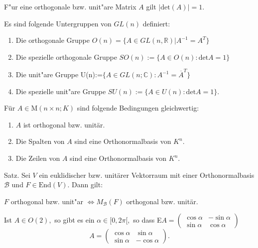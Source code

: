 \documentclass[8pt, a4paper, twocolumn, landscape]{article}
\begin{document}
\begin{remark}
F"ur eine orthogonale bzw. unit"are Matrix $A$ gilt $|\mathrm{det}(A)| = 1$.
\end{remark}

\begin{definition}
Es sind folgende Untergruppen von $GL(n)$ definiert:
\begin{enumerate}
\item Die orthogonale Gruppe $O(n) = \{ A \in GL(n, \mathbb{R}) | A^{-1} = A^T \}$
\item Die spezielle orthogonale Gruppe $SO(n):=\{A \in O(n): \mathrm{det} A=1\}$
\item Die unit"are Gruppe U(n):=$\{A \in GL(n ; \mathbb{C}): A^{-1}= \overline{A}^T\}$
\item Die spezielle unit"are Gruppe $SU(n):=\{A \in U(n): \mathrm{det} A=1\}$.
\end{enumerate}

\end{definition}

\begin{remark}
Für \(A \in \mathrm{M}(n \times n ; K)\) sind folgende Bedingungen gleichwertig:
\begin{enumerate}
\item \(A\) ist orthogonal bzw. unitär.
\item Die Spalten von \(A\) sind eine Orthonormalbasis von \(K^{n}\).
\item Die Zeilen von \(A\) sind eine Orthonormalbasis von \(K^{n}\).
\end{enumerate}
\end{remark}


\begin{theorem}
Satz. Sei \(V\) ein euklidischer bzw. unitärer Vektorraum mit einer Orthonormalbasis \(\mathcal{B}\) und \(F \in \mathrm{End}(V)\). Dann gilt:

$F$ orthogonal bzw. unit"ar $\Leftrightarrow M_{\mathcal{B}}(F)$ orthogonal bzw. unitär.
\end{theorem}

\begin{lemma}
Ist \(A \in O(2),\) so gibt es ein \(\alpha \in[0,2 \pi[,\) so dass
E$A=\left(\begin{array}{cc}\cos \alpha  & -\sin \alpha 
\\ \sin \alpha & \cos \alpha\end{array}\right)$ 
$$A=\left(\begin{array}{cc}\cos \alpha & \sin \alpha \\ \sin \alpha & -\cos \alpha\end{array}\right).$$
\end{lemma}
\end{document}
